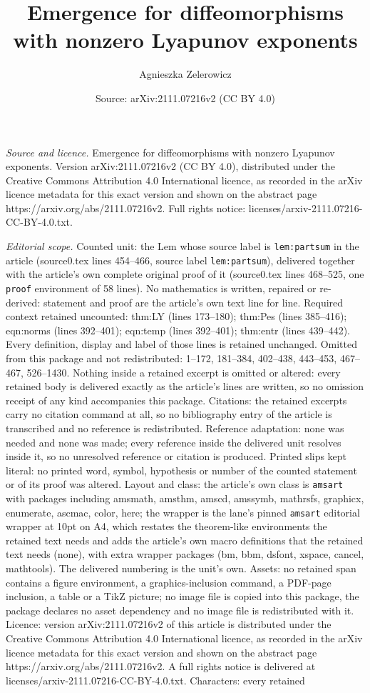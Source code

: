 \documentclass[10pt,a4paper]{amsart}
\title[Emergence for diffeomorphisms with nonzero Lyapunov exponent]{Emergence for diffeomorphisms with nonzero Lyapunov exponents}
\author{Agnieszka Zelerowicz}
\date{Source: arXiv:2111.07216v2 (CC BY 4.0)}
\begin{document}
\maketitle

\noindent\emph{Source and licence.} Emergence for diffeomorphisms with nonzero Lyapunov exponents. Version arXiv:2111.07216v2 (CC BY 4.0), distributed under the Creative Commons Attribution 4.0 International licence, as recorded in the arXiv licence metadata for this exact version and shown on the abstract page https://arxiv.org/abs/2111.07216v2. Full rights notice: licenses/arxiv-2111.07216-CC-BY-4.0.txt.\par\smallskip

\noindent\textit{Editorial scope.} Counted unit: the Lem whose source label is \texttt{lem:partsum} in the article (source0.tex lines 454--466, source label \texttt{lem:partsum}), delivered together with the article's own complete original proof of it (source0.tex lines 468--525, one \texttt{proof} environment of 58 lines). No mathematics is written, repaired or re-derived: statement and proof are the article's own text line for line. Required context retained uncounted: thm:LY (lines 173--180); thm:Pes (lines 385--416); eqn:norms (lines 392--401); eqn:temp (lines 392--401); thm:entr (lines 439--442). Every definition, display and label of those lines is retained unchanged. Omitted from this package and not redistributed: 1--172, 181--384, 402--438, 443--453, 467--467, 526--1430. Nothing inside a retained excerpt is omitted or altered: every retained body is delivered exactly as the article's lines are written, so no omission receipt of any kind accompanies this package. Citations: the retained excerpts carry no citation command at all, so no bibliography entry of the article is transcribed and no reference is redistributed. Reference adaptation: none was needed and none was made; every reference inside the delivered unit resolves inside it, so no unresolved reference or citation is produced. Printed slips kept literal: no printed word, symbol, hypothesis or number of the counted statement or of its proof was altered. Layout and class: the article's own class is \texttt{amsart} with packages including amsmath, amsthm, amscd, amssymb, mathrsfs, graphicx, enumerate, ascmac, color, here; the wrapper is the lane's pinned \texttt{amsart} editorial wrapper at 10pt on A4, which restates the theorem-like environments the retained text needs and adds the article's own macro definitions that the retained text needs (none), with extra wrapper packages (bm, bbm, dsfont, xspace, cancel, mathtools). The delivered numbering is the unit's own. Assets: no retained span contains a figure environment, a graphics-inclusion command, a PDF-page inclusion, a table or a TikZ picture; no image file is copied into this package, the package declares no asset dependency and no image file is redistributed with it. Licence: version arXiv:2111.07216v2 of this article is distributed under the Creative Commons Attribution 4.0 International licence, as recorded in the arXiv licence metadata for this exact version and shown on the abstract page https://arxiv.org/abs/2111.07216v2. A full rights notice is delivered at licenses/arxiv-2111.07216-CC-BY-4.0.txt. Characters: every retained 
\end{document}
